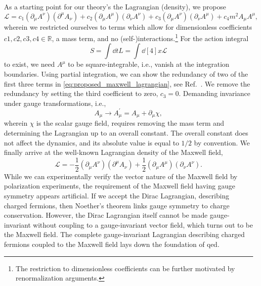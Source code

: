 As a starting point for our theory's the Lagrangian (density), we propose
\begin{equation}
	\mathcal{L}
	=
	c_1
	\left(
		\partial_\mu
		A^\nu
	\right)
	\left(
		\partial^\mu
		A_\nu
	\right)
	+
	c_2
	\left(
		\partial_\mu
		A^\mu
	\right)
	\left(
		\partial_\nu
		A^\nu
	\right)
	+
	c_3
	\left(
		\partial_\mu
		A^\nu
	\right)
	\left(
		\partial_\nu
		A^\mu
	\right)
	+
	c_4
	m^2
	A_\mu A^\mu
	\label{eq:proposed_maxwell_lagrangian_proposal},
\end{equation}
wherein we restricted ourselves to terms which allow for dimensionless coefficients $c1,c2,c3,c4\in\mathbb{R}$, a mass term, and no (self-)interactions.\footnote{The restriction to dimensionless coefficients can be further motivated by renormalization arguments.}
For the action integral
\begin{equation}
	S
	=
	\int\dd{t}
	L
	=
	\int\dd[4]{x}
	\mathcal{L}
\end{equation}
to exist, we need $A^\mu$ to be square-integrable, i.e., vanish at the integration boundaries.
Using partial integration, we can show the redundancy of two of the first three terms in \cref{eq:proposed_maxwell_lagrangian}, see Ref.~\cite{deRham2014}.
We remove the redundancy by setting the third coefficient to zero, $c_3=0$.
Demanding invariance under gauge transformations, i.e.,
\begin{equation}
	A_\mu
	\to
	A_\mu^\prime
	=
	A_\mu
	+
	\partial_\mu\chi
	,
\end{equation}
wherein $\chi$ is the scalar gauge field, requires removing the mass term and determining the Lagrangian up to an overall constant.
The overall constant does not affect the dynamics, and its absolute value is equal to $1/2$ by convention.
We finally arrive at the well-known Lagrangian density of the Maxwell field,
\begin{equation}
	\mathcal{L}
	=
	-
	\frac{1}{2}
	\left(
		\partial_\mu
		A^\nu
	\right)
	\left(
		\partial^\mu
		A_\nu
	\right)
	+
	\frac{1}{2}
	\left(
		\partial_\mu
		A^\mu
	\right)
	\left(
		\partial_\nu
		A^\nu
	\right)
	\label{eq:maxwell_lagrangian_field}
	.
\end{equation}
While we can experimentally verify the vector nature of the Maxwell field by polarization experiments, the requirement of the Maxwell field having gauge symmetry appears artificial.
If we accept the Dirac Lagrangian, describing charged fermions, then Noether's theorem links gauge symmetry to charge conservation.
However, the Dirac Lagrangian itself cannot be made gauge-invariant without coupling to a gauge-invariant vector field, which turns out to be the Maxwell field.
The complete gauge-invariant Lagrangian describing charged fermions coupled to the Maxwell field lays down the foundation of \gls{qed}.

